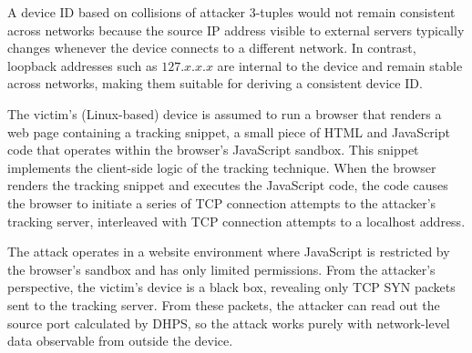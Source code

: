 \documentclass{report}
\begin{document}


A device ID based on collisions of \alert{attacker 3-tuples} would not remain consistent across networks because the source IP address visible to external servers typically changes whenever the device connects to a different network. In contrast, loopback addresses such as $127.x.x.x$ are internal to the device and remain stable across networks, making them suitable for deriving a consistent device ID. %

The victim’s (Linux-based) device is assumed to run a browser that renders a web page containing a \alert{tracking snippet}, a small piece of HTML and JavaScript code that operates within the browser’s JavaScript sandbox. This snippet implements the client-side logic of the tracking technique. When the browser renders the tracking snippet and executes the JavaScript code, the code causes the browser to initiate a series of TCP connection attempts to the attacker’s tracking server, interleaved with TCP connection attempts to a localhost address.

The attack operates in a website environment where JavaScript is restricted by the \alert{browser’s sandbox} and has only limited permissions. From the attacker’s perspective, the victim’s device is a \alert{black box}, revealing only \alert{TCP SYN packets} sent to the tracking server. From these packets, the attacker can read out the source port calculated by DHPS, so the attack works purely with network-level data observable from outside the device.
\end{document}
